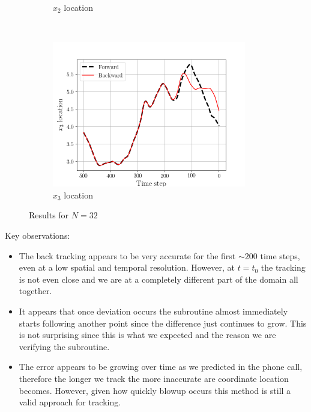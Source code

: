 \begin{figure}[H]
\begin{subfigure}[H]{0.45\textwidth}
        \caption{$x_{2}$ location}
    \end{subfigure}
    ~
    \begin{subfigure}[H]{0.45\textwidth}
        \includegraphics[height=2.5in]{media/rk4/run-32/x3-32-tracking.png}
        \caption{$x_{3}$ location}
    \end{subfigure}
    \caption{Results for $N=32$}
    \label{fig:back-tracking-32}
\end{figure}
Key observations:
\begin{itemize}
    \item The back tracking appears to be very accurate for the first $\sim
        200$ time steps, even at a low spatial and temporal resolution.
        However, at $t=t_{0}$ the tracking is not even close and we are at
        a completely different part of the domain all together.
    \item It appears that once deviation occurs the subroutine almost
        immediately starts following another point since the difference
        just continues to grow. This is not surprising since this is what
        we expected and the reason we are verifying the subroutine.
    \item The error appears to be growing over time as we predicted in the
        phone call, therefore the longer we track the more inaccurate are
        coordinate location becomes. However, given how quickly blowup
        occurs this method is still a valid approach for tracking.

\end{itemize}

